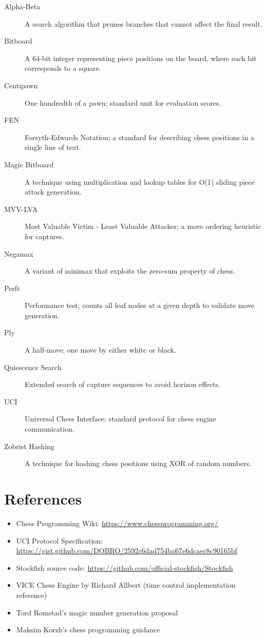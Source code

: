 \documentclass[11pt,a4paper]{report}
\begin{document}
\begin{description}
    \item[Alpha-Beta] A search algorithm that prunes branches that cannot affect the final result.
    \item[Bitboard] A 64-bit integer representing piece positions on the board, where each bit corresponds to a square.
    \item[Centipawn] One hundredth of a pawn; standard unit for evaluation scores.
    \item[FEN] Forsyth-Edwards Notation; a standard for describing chess positions in a single line of text.
    \item[Magic Bitboard] A technique using multiplication and lookup tables for O(1) sliding piece attack generation.
    \item[MVV-LVA] Most Valuable Victim - Least Valuable Attacker; a move ordering heuristic for captures.
    \item[Negamax] A variant of minimax that exploits the zero-sum property of chess.
    \item[Perft] Performance test; counts all leaf nodes at a given depth to validate move generation.
    \item[Ply] A half-move; one move by either white or black.
    \item[Quiescence Search] Extended search of capture sequences to avoid horizon effects.
    \item[UCI] Universal Chess Interface; standard protocol for chess engine communication.
    \item[Zobrist Hashing] A technique for hashing chess positions using XOR of random numbers.
\end{description}

\chapter{References}

\begin{itemize}
    \item Chess Programming Wiki: \url{https://www.chessprogramming.org/}
    \item UCI Protocol Specification: \url{https://gist.github.com/DOBRO/2592c6dad754ba67e6dcaec8c90165bf}
    \item Stockfish source code: \url{https://github.com/official-stockfish/Stockfish}
    \item VICE Chess Engine by Richard Allbert (time control implementation reference)
    \item Tord Romstad's magic number generation proposal
    \item Maksim Korzh's chess programming guidance
\end{itemize}

\end{document}
